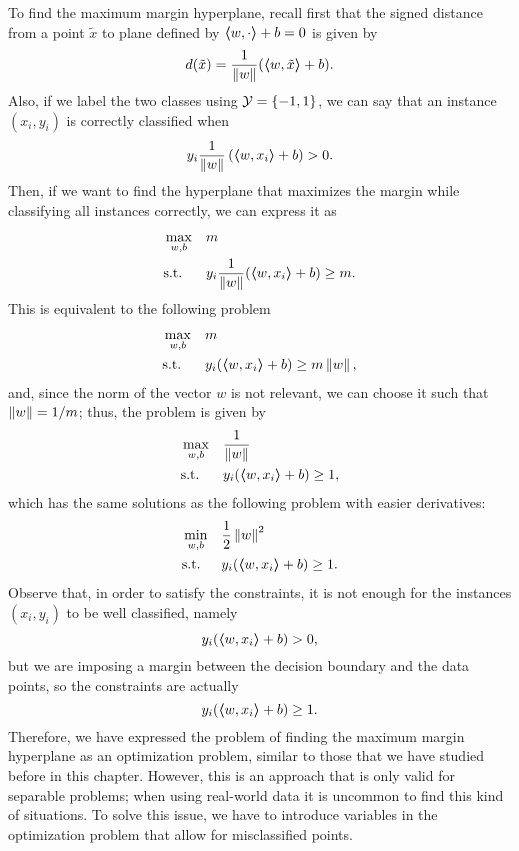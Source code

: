 To find the maximum margin hyperplane, recall first that the signed distance from a point $\tilde{x}$ to plane defined by $\bm{\left\langle} w, \cdot \bm{\right\rangle} + b = 0$ is given by 
\begin{equation}
    \nonumber
    d(\tilde{x}) = \frac{1}{\left\lVert w\right\rVert} (\bm{\left\langle} w, \tilde{x} \bm{\right\rangle} + b) .
\end{equation}
Also, if we label the two classes using $\mathcal{Y} = \left\{-1, 1\right\}$, we can say that an instance $(x_i, y_i)$ is correctly classified when $$y_i \frac{1}{\left\lVert w\right\rVert} \left(\bm{\left\langle} w, x_i \bm{\right\rangle} + b \right) > 0 .$$
Then, if we want to find the hyperplane that maximizes the margin while classifying all instances correctly, we can express it as
\begin{equation}\nonumber
    \begin{aligned}
        &\max_{w, b} & & m \\
        & \text{s.t.} & & y_i \frac{1}{\left\lVert w\right\rVert} (\bm{\left\langle} w, x_i \bm{\right\rangle} + b) \geq m .         
    \end{aligned}  
\end{equation}
This is equivalent to the following problem 
\begin{equation}\nonumber
    \begin{aligned}
        &\max_{w, b} & & m \\
        & \text{s.t.} & & y_i (\bm{\left\langle} w, x_i \bm{\right\rangle} + b) \geq m \left\lVert w\right\rVert ,       
    \end{aligned}  
\end{equation}
and, since the norm of the vector $w$ is not relevant, we can choose it such that $\left\lVert w\right\rVert = 1 / m$; thus, the problem is given by
\begin{equation}\nonumber
    \begin{aligned}
        &\max_{w, b} & & \frac{1}{\left\lVert w\right\rVert} \\
        & \text{s.t.} & & y_i (\bm{\left\langle} w, x_i \bm{\right\rangle} + b) \geq 1 ,       
    \end{aligned}  
\end{equation}
which has the same solutions as the following problem with easier derivatives:
\begin{equation}
    \label{eq:separable_primal}
    \begin{aligned}
        &\min_{w, b} & & \frac{1}{2} \norm{w}^2 \\
        & \text{s.t.} & & y_i (\dotp{w}{x_i} + b) \geq 1 .       
    \end{aligned}  
\end{equation}
%
Observe that, in order to satisfy the constraints, it is not enough for the instances $(x_i, y_i)$ to be well classified, namely 
$$ y_i (\bm{\left\langle} w, x_i \bm{\right\rangle} + b) > 0 ,$$
but we are imposing a margin between the decision boundary and the data points, so the constraints are actually 
$$ y_i (\bm{\left\langle} w, x_i \bm{\right\rangle} + b) \geq 1 .$$
Therefore, we have expressed the problem of finding the maximum margin hyperplane as an optimization problem, similar to those that we have studied before in this chapter. However, this is an approach that is only valid for separable problems; when using real-world data it is uncommon to find this kind of situations. To solve this issue, we have to introduce variables in the optimization problem that allow for misclassified points.

